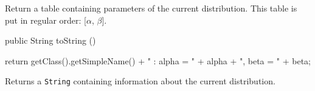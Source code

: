 \begin{tabb}
   Return a table containing parameters of the current distribution.
   This table is put in regular order: [$\alpha$, $\beta$].
\end{tabb}
\begin{hide}\begin{code}

   public String toString ()\begin{hide} {
      return getClass().getSimpleName() + " : alpha = " + alpha + ", beta = " + beta;
   }\end{hide}
\end{code}
\begin{tabb}
   Returns a \texttt{String} containing information about the current distribution.
\end{tabb}\end{hide}
\begin{code}\begin{hide}
}\end{hide}
\end{code}
